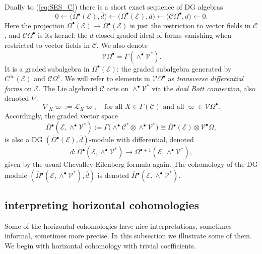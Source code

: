 \documentclass{conm-p-l}
\theoremstyle{definition}
\theoremstyle{remark}
\numberwithin{equation}{section}
\begin{document}
Dually to (\ref{eq:SES_C}) there is a short exact sequence of DG algebras
\[
0 \longleftarrow \big(\overline \Omega{}^\bullet (\mathscr E), \overline d\big) \longleftarrow \big( \Omega^\bullet (\mathscr E), d\big) \longleftarrow \big(\mathscr C \Omega^\bullet, d\big) \longleftarrow 0.
\]
Here the projection $\Omega^\bullet (\mathscr E) \to \overline \Omega{}^\bullet (\mathscr E)$ is just the restriction to vector fields in $\mathscr C$, and $\mathscr C \Omega^\bullet$ is its kernel: the $d$-closed graded ideal of forms vanishing when restricted to vector fields in $\mathscr C$. We also denote
\[
\mathscr V \Omega^\bullet = \Gamma (\wedge^\bullet \mathscr V^\ast).
\]
It is a graded subalgebra in $\Omega^\bullet (\mathscr E)$: the graded subalgebra generated by $C^\infty (\mathscr E)$ and $\mathscr C \Omega^1$. We will refer to elements in $\mathscr V \Omega^\bullet$ as \emph{transverse differential forms} on $\mathscr E$. The Lie algebroid $\mathscr C$ acts on $\wedge^\bullet \mathscr V^\ast$ via the \emph{dual Bott connection}, also denoted $\nabla$:
\[
\nabla_X \varpi := \mathcal L_X \varpi, \quad \text{for all $X \in \Gamma (\mathscr C)$ and all $\varpi \in \mathscr V \Omega^\bullet$}.
\]
Accordingly, the graded vector space
\[
\overline \Omega{}^{\bullet} (\mathscr E, \wedge^\bullet \mathscr V^\ast) := \Gamma \big(\wedge^\bullet \mathscr C^\ast \otimes \wedge^\bullet \mathscr V^\ast\big) \cong \overline \Omega{}^{\bullet} (\mathscr E) \otimes \mathscr V^\bullet \Omega,
\]
is also a DG $(\overline \Omega{}^{\bullet} (\mathscr E), \overline d)$-module with differential, denoted 
\[
\overline d : \overline \Omega{}^{\bullet} (\mathscr E, \wedge^\bullet \mathscr V^\ast) \to \overline \Omega{}^{\bullet +1 } (\mathscr E, \wedge^\bullet \mathscr V^\ast),
\]
 given by the usual Chevalley-Eilenberg formula again. The cohomology of the DG module $(\overline \Omega{}^{\bullet} (\mathscr E, \wedge^\bullet \mathscr V^\ast), \overline d)$ is denoted $\overline H{}^\bullet (\mathscr E, \wedge^\bullet \mathscr V^\ast)$.


\subsection{interpreting horizontal cohomologies} Some of the horizontal cohomologies have nice interpretations, sometimes informal, sometimes more precise. In this subsection we illustrate some of them. We begin with horizontal cohomology with trivial coefficients.
\end{document}
